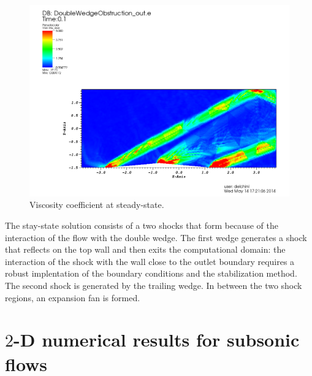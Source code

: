 %
        \begin{figure}[H]%
                \centering
                \includegraphics[scale=.50]{figures/DWOViscosityStt.png}
                \caption{Viscosity coefficient at steady-state.}
                \label{fig:2d_dbw_visc_stt}
        \end{figure}
The stay-state solution consists of a two shocks that form because of the interaction of the flow with the double wedge. The first wedge generates a shock that reflects on the top wall and then exits the computational domain: the interaction of the shock with the wall close to the outlet boundary requires a robust implentation of the boundary conditions and the stabilization method. The second shock is generated by the trailing wedge. In between the two shock regions, an expansion fan is formed. 
\section{$2$-D numerical results for subsonic flows} \label{sec:2d-susubsonic-results}
